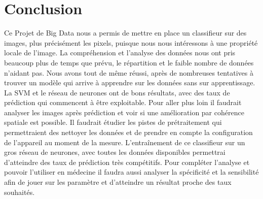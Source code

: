 \documentclass[a4paper,10pt]{report}
\begin{document}
\chapter*{Conclusion}
Ce Projet de Big Data nous a permis de mettre en place un classifieur sur des images, plus précisément les pixels, puisque nous nous intéressons à une propriété locale de l'image. La compréhension et l'analyse des données nous ont pris beaucoup plus de temps que prévu, le répartition et le faible nombre de données n'aidant pas. Nous avons tout de même réussi, après de nombreuses tentatives à trouver un modèle qui arrive à apprendre sur les données sans sur apprentissage. La SVM et le réseau de neurones ont de bons résultats, avec des taux de prédiction qui commencent à être exploitable. Pour aller plus loin il faudrait analyser les images après prédiction et voir si une amélioration par cohérence spatiale est possible. Il faudrait étudier les pistes de prétraitement qui permettraient des nettoyer les données et de prendre en compte la configuration de l'appareil au moment de la mesure. L’entraînement de ce classifieur sur un gros réseau de neurones, avec toutes les données disponibles permettrai d'atteindre des taux de prédiction très compétitifs. Pour compléter l'analyse et pouvoir l'utiliser en médecine il faudra aussi analyser la spécificité et la sensibilité afin de jouer sur les paramètre et d'atteindre un résultat proche des taux souhaités.

\tableofcontents
\listoffigures
\end{document}
